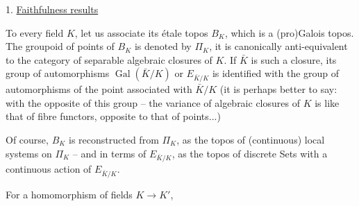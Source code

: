 1. \uline{Faithfulness results}

To every field $K$, let us associate its étale topos $B_K$, which is a (pro)Galois topos. The groupoid of points of $B_K$ is denoted by $\Pi_K$, it is canonically anti-equivalent to the category of separable algebraic closures of $K$. If $\bar K$ is such a closure, its group of automorphisms $\operatorname{Gal}(\bar K/K)$ or $E_{\bar K/K}$ is identified with the group of automorphisms of the point  associated with $\bar K/K$ (it is perhaps better to say: with the opposite of this group --  the variance of algebraic closures of $K$ is like that of fibre functors, opposite to that of points...)

Of course, $B_K$ is reconstructed from $\Pi_K$, as the topos of (continuous) local systems on $\Pi_K$ -- and in terms of $E_{\bar K/K}$, as the topos of discrete Sets with a continuous action of $E_{\bar K/K}$.

For a homomorphism of fields $K\longrightarrow K'$,
